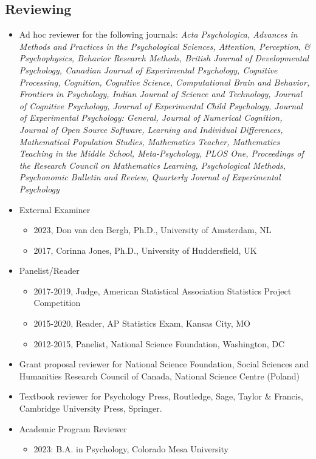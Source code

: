 \documentclass[article,10pt]{article}
\begin{document}
\subsection*{Reviewing}
\label{sec:orgde1208e}

\begin{itemize}
\item Ad hoc reviewer for the following journals: \emph{Acta Psychologica, Advances in Methods and Practices in the Psychological Sciences, Attention, Perception, \& Psychophysics, Behavior Research Methods, British Journal of Developmental Psychology, Canadian Journal of Experimental Psychology, Cognitive Processing, Cognition, Cognitive Science, Computational Brain and Behavior, Frontiers in Psychology, Indian Journal of Science and Technology, Journal of Cognitive Psychology, Journal of Experimental Child Psychology, Journal of Experimental Psychology: General, Journal of Numerical Cognition, Journal of Open Source Software, Learning and Individual Differences, Mathematical Population Studies, Mathematics Teacher, Mathematics Teaching in the Middle School, Meta-Psychology, PLOS One, Proceedings of the Research Council on Mathematics Learning, Psychological Methods, Psychonomic Bulletin and Review, Quarterly Journal of Experimental Psychology}
\item External Examiner
\begin{itemize}
\item 2023, Don van den Bergh, Ph.D., University of Amsterdam, NL
\item 2017, Corinna Jones, Ph.D., University of Huddersfield, UK
\end{itemize}
\item Panelist/Reader
\begin{itemize}
\item 2017-2019, Judge, American Statistical Association Statistics Project Competition
\item 2015-2020, Reader, AP Statistics Exam, Kansas City, MO
\item 2012-2015, Panelist, National Science Foundation, Washington, DC
\end{itemize}
\item Grant proposal reviewer for National Science Foundation, Social Sciences and Humanities Research Council of Canada, National Science Centre (Poland)
\item Textbook reviewer for Psychology Press, Routledge, Sage, Taylor \& Francis, Cambridge University Press, Springer.
\item Academic Program Reviewer
\begin{itemize}
\item 2023: B.A. in Psychology, Colorado Mesa University
\end{itemize}
\end{itemize}
\end{document}
